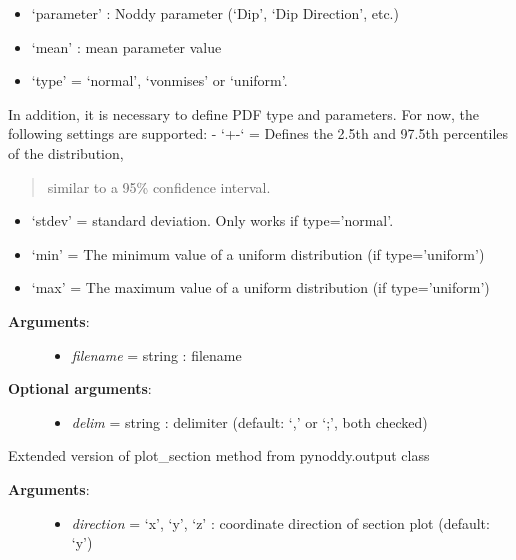 \documentclass[a4paper,10pt,english]{sphinxmanual}
\begin{document}
\begin{fulllineitems}
\begin{fulllineitems}
\begin{itemize}
\item {} 
`parameter' : Noddy parameter (`Dip', `Dip Direction', etc.)

\item {} 
`mean' : mean parameter value

\item {} 
`type' = `normal', `vonmises' or `uniform'.

\end{itemize}

In addition, it is necessary to define PDF type and parameters. For now, the following settings are supported:
- `+-` = Defines the 2.5th and 97.5th percentiles of the distribution,
\begin{quote}

similar to a 95\% confidence interval.
\end{quote}
\begin{itemize}
\item {} 
`stdev' = standard deviation. Only works if type='normal'.

\item {} 
`min' = The minimum value of a uniform distribution (if type='uniform')

\item {} 
`max' = The maximum value of a uniform distribution (if type='uniform')

\end{itemize}
\begin{description}
\item[{\textbf{Arguments}:}] \leavevmode\begin{itemize}
\item {} 
\emph{filename} = string : filename

\end{itemize}

\item[{\textbf{Optional arguments}:}] \leavevmode\begin{itemize}
\item {} 
\emph{delim} = string : delimiter (default: `,' or `;', both checked)

\end{itemize}

\end{description}

\end{fulllineitems}


\begin{fulllineitems}
\label{pynoddy:pynoddy.experiment.Experiment.plot_section}
Extended version of plot\_section method from pynoddy.output class
\begin{description}
\item[{\textbf{Arguments}:}] \leavevmode\begin{itemize}
\item {} 
\emph{direction} = `x', `y', `z' : coordinate direction of section plot (default: `y')


\end{itemize}
\end{description}
\end{fulllineitems}
\end{fulllineitems}
\end{document}
